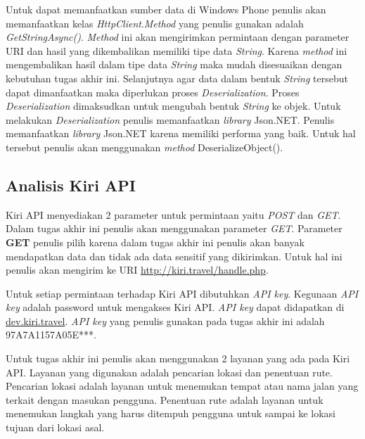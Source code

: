 Untuk dapat memanfaatkan sumber data di Windows Phone penulis akan memanfaatkan kelas \textit{HttpClient}.\textit{Method} yang penulis gunakan adalah \textit{GetStringAsync()}. \textit{Method} ini akan mengirimkan permintaan dengan parameter URI dan hasil yang dikembalikan memiliki tipe data \textit{String}. Karena \textit{method} ini mengembalikan hasil dalam tipe data \textit{String} maka mudah disesuaikan dengan kebutuhan tugas akhir ini. Selanjutnya agar data dalam bentuk \textit{String} tersebut dapat dimanfaatkan maka diperlukan proses \textit{Deserialization}. Proses \textit{Deserialization} dimaksudkan untuk mengubah bentuk \textit{String} ke objek. Untuk melakukan \textit{Deserialization} penulis memanfaatkan \textit{library} Json.NET. Penulis memanfaatkan \textit{library} Json.NET karena memiliki performa yang baik. Untuk hal tersebut penulis akan menggunakan \textit{method} DeserializeObject().

\subsection{Analisis Kiri API}
\label{lab:Analisis Kiri API}
\hspace{0.5cm} Kiri API menyediakan 2 parameter untuk permintaan yaitu \textit{POST} dan \textit{GET}. Dalam tugas akhir ini penulis akan menggunakan parameter \textit{GET}. Parameter \textbf{GET} penulis pilih karena dalam tugas akhir ini penulis akan banyak mendapatkan data dan tidak ada data sensitif yang dikirimkan. Untuk hal ini penulis akan mengirim ke URI \url{http://kiri.travel/handle.php}.

Untuk setiap permintaan terhadap Kiri API dibutuhkan \textit{API key}. Kegunaan \textit{API key} adalah password untuk mengakses Kiri API. \textit{API key} dapat didapatkan di \url{dev.kiri.travel}. \textit{API key} yang penulis gunakan pada tugas akhir ini adalah 97A7A1157A05E***. %
     
Untuk tugas akhir ini penulis akan menggunakan 2 layanan yang ada pada Kiri API. Layanan yang digunakan adalah pencarian lokasi dan penentuan rute. Pencarian lokasi adalah layanan untuk menemukan tempat atau nama jalan yang terkait dengan masukan pengguna. Penentuan rute adalah layanan untuk menemukan langkah yang harus ditempuh pengguna untuk sampai ke lokasi tujuan dari lokasi asal. 

